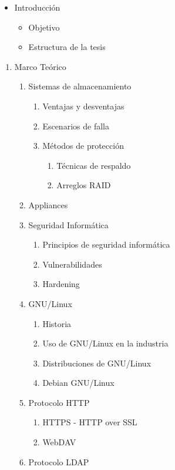 {\begin{itemize}
  \item Introducci\'{o}n
  \begin{itemize}
    \item Objetivo
    \item Estructura de la tesis
  \end{itemize}
\end{itemize}
\begin{enumerate}
  \item Marco Te\'{o}rico
  \begin{enumerate}
    \item Sistemas de almacenamiento
    \begin{enumerate}
      \item Ventajas y desventajas
      \item Escenarios de falla
      \item M\'{e}todos de protecci\'{o}n
      \begin{enumerate}
        \item T\'{e}cnicas de respaldo
        \item Arreglos RAID
      \end{enumerate}
    \end{enumerate}
    \item Appliances
    \item Seguridad Inform\'{a}tica
    \begin{enumerate}
      \item Principios de seguridad inform\'{a}tica
      \item Vulnerabilidades
      \item Hardening
    \end{enumerate}
    \item GNU/Linux
    \begin{enumerate}
      \item Historia
      \item Uso de GNU/Linux en la industria
      \item Distribuciones de GNU/Linux
      \item Debian GNU/Linux
    \end{enumerate}
    \item Protocolo HTTP
    \begin{enumerate}
      \item HTTPS - HTTP over SSL
      \item WebDAV
    \end{enumerate}
    \item Protocolo LDAP

\end{enumerate}
\end{enumerate}}
